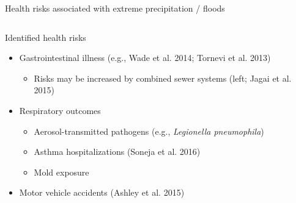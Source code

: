 \documentclass[ignorenonframetext,]{beamer}
\begin{document}
\begin{frame}{Health risks associated with extreme precipitation /
floods}
\begin{columns}
\begin{column}{0.55\textwidth}
\begin{block}{Identified health risks}
\small
\begin{itemize}
  \item Gastrointestinal illness (e.g., Wade et al. 2014; Tornevi et al. 2013)
  \begin{itemize}
    \item Risks may be increased by combined sewer systems (left; Jagai et al. 2015)
  \end{itemize}
  \item Respiratory outcomes
  \begin{itemize}
    \item Aerosol-transmitted pathogens (e.g., \textit{Legionella pneumophila})
    \item Asthma hospitalizations (Soneja et al. 2016)
    \item Mold exposure
  \end{itemize}
  \item Motor vehicle accidents (Ashley et al. 2015)
\end{itemize}
\end{block}
\end{column}

\end{columns}

\end{frame}
\end{document}
